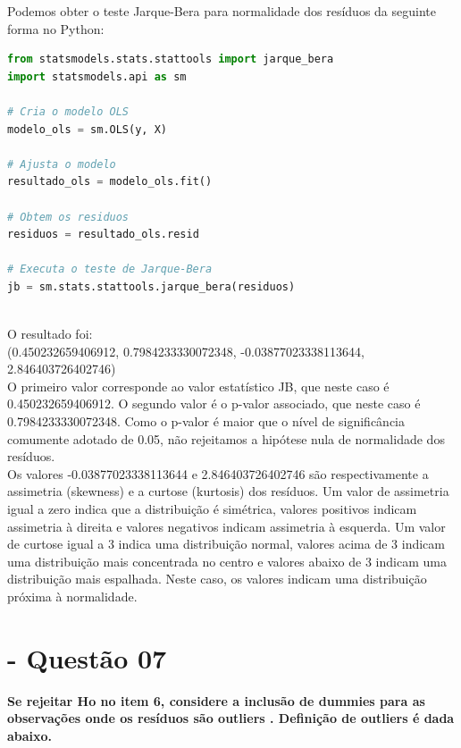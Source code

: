 \documentclass[a4paper, 12pt]{article}
\begin{document}
Podemos obter o teste Jarque-Bera para normalidade dos resíduos da seguinte forma no Python:


\begin{tcolorbox}[colback=white,boxrule=1pt,arc=5pt,auto outer arc]
  \begin{lstlisting}[language=Python]
from statsmodels.stats.stattools import jarque_bera
import statsmodels.api as sm

# Cria o modelo OLS
modelo_ols = sm.OLS(y, X)

# Ajusta o modelo
resultado_ols = modelo_ols.fit()

# Obtem os residuos
residuos = resultado_ols.resid

# Executa o teste de Jarque-Bera
jb = sm.stats.stattools.jarque_bera(residuos)
    \end{lstlisting}
\end{tcolorbox} \\

O resultado foi: \\

(0.450232659406912,
 0.7984233330072348,
 -0.03877023338113644,
 2.846403726402746) \\

O primeiro valor corresponde ao valor estatístico JB, que neste caso é 0.450232659406912. O segundo valor é o p-valor associado, que neste caso é 0.7984233330072348. Como o p-valor é maior que o nível de significância comumente adotado de 0.05, não rejeitamos a hipótese nula de normalidade dos resíduos.\\

Os valores -0.03877023338113644 e 2.846403726402746 são respectivamente a assimetria (skewness) e a curtose (kurtosis) dos resíduos. Um valor de assimetria igual a zero indica que a distribuição é simétrica, valores positivos indicam assimetria à direita e valores negativos indicam assimetria à esquerda. Um valor de curtose igual a 3 indica uma distribuição normal, valores acima de 3 indicam uma distribuição mais concentrada no centro e valores abaixo de 3 indicam uma distribuição mais espalhada. Neste caso, os valores indicam uma distribuição próxima à normalidade.


\section{- Questão 07}
\textbf{Se rejeitar Ho no item 6, considere a inclusão de dummies para as observações onde os resíduos são outliers . Definição de outliers é dada abaixo.}
\end{document}

